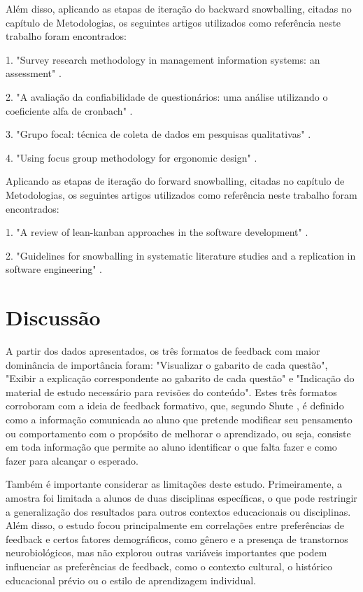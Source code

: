 Além disso, aplicando as etapas de iteração do backward snowballing, citadas no capítulo de Metodologias, os seguintes artigos utilizados como referência neste trabalho foram encontrados:

1. "Survey research methodology in management information systems: an assessment" \cite{pinsonneault1993survey}.

2. "A avaliação da confiabilidade de questionários: uma análise utilizando o coeficiente alfa de cronbach" \cite{freitas2005avaliaccao}.

3. "Grupo focal: técnica de coleta de dados em pesquisas qualitativas" \cite{dias2000grupo}.

4. "Using focus group methodology for ergonomic design" \cite{caplan1990using}.

Aplicando as etapas de iteração do forward snowballing, citadas no capítulo de Metodologias, os seguintes artigos utilizados como referência neste trabalho foram encontrados:

1. "A review of lean-kanban approaches in the software development" \cite{corona2013review}.

2. "Guidelines for snowballing in systematic literature studies and a replication in software engineering" \cite{wohlin2014guidelines}.

\section{Discussão}

A partir dos dados apresentados, os três formatos de feedback com maior dominância de importância foram: "Visualizar o gabarito de cada questão", "Exibir a explicação correspondente ao gabarito de cada questão" e "Indicação do material de estudo necessário para revisões do conteúdo". Estes três formatos corroboram com a ideia de feedback formativo, que, segundo Shute \cite{shute2008focus}, é definido como a informação comunicada ao aluno que pretende modificar seu pensamento ou comportamento com o propósito de melhorar o aprendizado, ou seja, consiste em toda informação que permite ao aluno identificar o que falta fazer e como fazer para alcançar o esperado.

Também é importante considerar as limitações deste estudo. Primeiramente, a amostra foi limitada a alunos de duas disciplinas específicas, o que pode restringir a generalização dos resultados para outros contextos educacionais ou disciplinas. Além disso, o estudo focou principalmente em correlações entre preferências de feedback e certos fatores demográficos, como gênero e a presença de transtornos neurobiológicos, mas não explorou outras variáveis importantes que podem influenciar as preferências de feedback, como o contexto cultural, o histórico educacional prévio ou o estilo de aprendizagem individual.